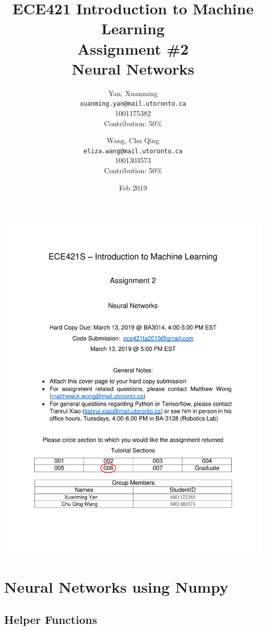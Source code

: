 \documentclass[10pt,letterpaper]{article}
\title{ECE421 Introduction to Machine Learning \\
    Assignment \#2 \\
    Neural Networks}
\date{Feb 2019}
\author{
  Yan, Xuanming\\
  \texttt{xuanming.yan@mail.utoronto.ca} \\
  1001175382 \\
  Contribution: 50\%
  \and
  Wang, Chu Qing\\
  \texttt{eliza.wang@mail.utoronto.ca} \\
  1001303573\\
  Contribution: 50\%
} %
\begin{document}
\includegraphics[width=1\linewidth]{a2cover.pdf}


\maketitle %


\section{Neural Networks using Numpy}


\subsection{Helper Functions}
\end{document}
